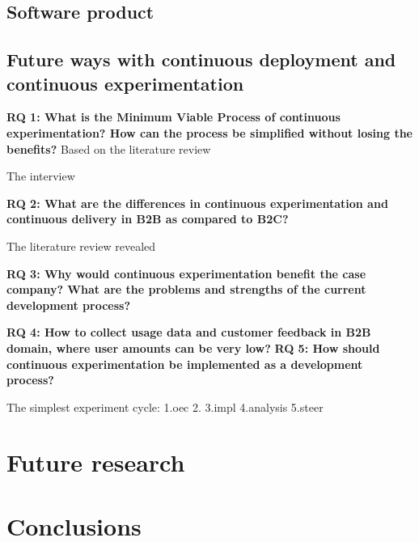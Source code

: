 \documentclass[english]{tktltiki2}
\theoremstyle{definition}
\theoremstyle{remark}
\begin{document}
\subsection{Software product}

\subsection{Future ways with continuous deployment and continuous experimentation}

\textbf{RQ 1: What is the Minimum Viable Process of continuous experimentation? How can the process be simplified without losing the benefits?}
Based on the literature review

The interview

\textbf{RQ 2: What are the differences in continuous experimentation and continuous delivery in B2B as compared to B2C?}

The literature review revealed

\textbf{RQ 3: Why would continuous experimentation benefit the case company? What are the problems and strengths of the current development process?}


\textbf{RQ 4: How to collect usage data and customer feedback in B2B domain, where user amounts can be very low?}
\textbf{RQ 5: How should continuous experimentation be implemented as a development process?}


The simplest experiment cycle:
1.oec
2.
3.impl
4.analysis
5.steer

\section{Future research}

\section{Conclusions}

\newpage

%
%
% 
%








% 
\end{document}
